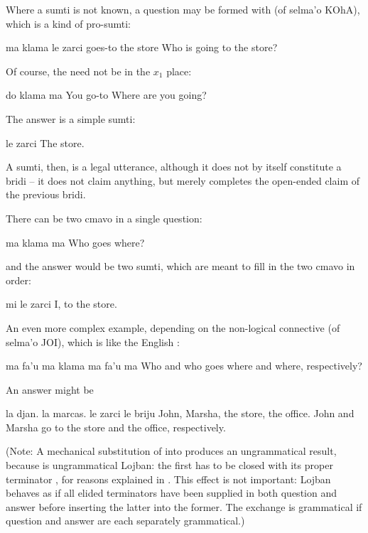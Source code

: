 Where a sumti is not known, a question may be formed with
     (of selma'o KOhA), which is a kind of pro-sumti:
\begin{example}
ma klama le zarci\n
{} goes-to the store\n
Who is going to the store?
\end{example}

Of course, the  need not be in the $x_1$ place:
\begin{example}
do klama ma\n
You go-to \n
Where are you going?
\end{example}

The answer is a simple sumti:
\begin{example}
le zarci\n
The store.
\end{example}

A sumti, then, is a legal utterance, although it does not by
    itself constitute a bridi -- it does not claim anything, but
    merely completes the open-ended claim of the previous
    bridi.

There can be two  cmavo in a single question:
\begin{example}
ma klama ma\n
Who goes where?
\end{example}

{\noindent}and the answer would be two sumti, which are meant to fill in
    the two  cmavo in order:
\begin{example}
mi le zarci\n
I, to the store.
\end{example}

An even more complex example, depending on the non-logical
    connective  (of selma'o JOI), which is like the English
    :
\begin{example}
ma fa'u ma klama ma fa'u ma\n
Who and who goes where and where, respectively?
\end{example}

An answer might be
\begin{example}
la djan. la marcas. le zarci le briju\n
John, Marsha, the store, the office.\n
John and Marsha go to the store and the office,\n
\T	respectively.
\end{example}

(Note: A mechanical substitution of  into  produces an
    ungrammatical result, because 
    is ungrammatical Lojban: the first  has to be
    closed with its proper terminator , for reasons explained
    in . This effect is not
    important: Lojban behaves as if all elided terminators have
    been supplied in both question and answer before inserting the
    latter into the former. The exchange is grammatical if question
    and answer are each separately grammatical.) 

